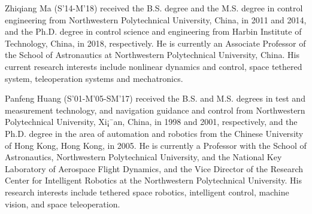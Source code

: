 \documentclass[10pt,onecolumn,draftcls]{IEEEtran}
\begin{document}
\begin{IEEEbiography}{Zhiqiang Ma (S'14-M'18)}
		 received the B.S. degree and the M.S. degree in control engineering from Northwestern Polytechnical University, China, in 2011 and 2014, and the Ph.D. degree in control science and engineering from Harbin Institute of Technology, China, in 2018, respectively. He is currently an Associate Professor of the School of Astronautics at Northwestern Polytechnical University, China. His current research interests include nonlinear dynamics and control, space tethered system, teleoperation systems and mechatronics.
		
		\end{IEEEbiography}
	\begin{IEEEbiography}{Panfeng Huang (S'01-M'05-SM'17)}
	 received the B.S. and M.S. degrees in test and measurement technology, and navigation guidance and control from Northwestern Polytechnical University, Xi¡¯an, China, in 1998 and 2001, respectively, and the Ph.D. degree in the area of automation and robotics from the Chinese University of Hong Kong, Hong Kong, in 2005. He is currently a Professor with the School of Astronautics, Northwestern Polytechnical University, and the National Key Laboratory of Aerospace Flight Dynamics, and the Vice Director of the Research Center for Intelligent Robotics at the Northwestern Polytechnical University. His research interests include tethered space robotics, intelligent control, machine vision, and space teleoperation.
	
	\end{IEEEbiography}


\end{document}
